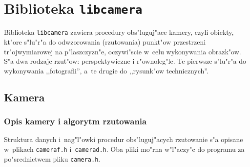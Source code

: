 

\chapter{Biblioteka \texttt{libcamera}}

Biblioteka \texttt{libcamera} zawiera procedury obs"luguj"ace kamery, czyli
obiekty, kt"ore s"lu"r"a do odwzorowania (rzutowania) punkt"ow przestrzeni
tr"ojwymiarowej na p"laszczyzn"e, oczywi"scie w~celu wykonywania obrazk"ow.
S"a dwa rodzaje rzut"ow: perspektywiczne i r"ownoleg"le. Te pierwsze s"lu"r"a
do wykonywania ,,fotografii'', a~te drugie do ,,rysunk"ow technicznych''.


\section{Kamera}

\subsection{Opis kamery i algorytm rzutowania}

Struktura danych i~nag"l"owki procedur obs"luguj"acych rzutowanie
s"a opisane w~plikach \texttt{cameraf.h} i~\texttt{camerad.h}.
Oba pliki mo"rna w"l"aczy"c do programu za po"srednictwem pliku
\texttt{camera.h}.


